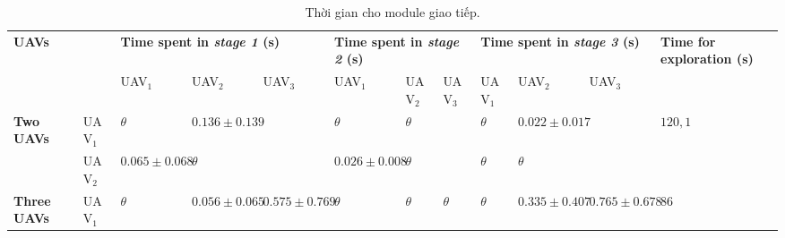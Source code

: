 \documentclass[11pt,openany]{book}
\begin{document}
\begin{table}[H]
    \centering
    \small
    \caption{Thời gian cho module giao tiếp.}
    \label{tab:4.4}
    \begin{tabular}{|p{0.8cm}|p{0.7cm}|p{0.7cm}|p{0.7cm}|p{0.7cm}|p{0.7cm}|p{0.7cm}|p{0.7cm}|p{0.7cm}|p{0.7cm}|p{0.7cm}|p{1cm}|}\hline
        \multicolumn{2}{|l|}{\multirow{2}{1cm}{\textbf{UAVs}}} & \multicolumn{3}{|p{2.1cm}|}{\textbf{Time spent in \textit{stage 1} (s)}} & \multicolumn{3}{|p{2.1cm}|}{\textbf{Time spent in \textit{stage 2} (s)}} & \multicolumn{3}{|p{2.1cm}|}{\textbf{Time spent in \textit{stage 3} (s)}} & \textbf{Time for exploration (s)}                                                                                                                      \\\cline{3-11}
        \multicolumn{2}{|l|}{}                                 & UAV$_1$                                                                  & UAV$_2$                                                                  & UAV$_3$                                                                  & UAV$_1$                           & UAV$_2$           & UAV$_3$  & UAV$_1$  & UAV$_2$  & UAV$_3$           &                                           \\\hline
        \multirow{2}{0.8cm}{\textbf{Two UAVs}}                 & UAV$_1$                                                                  & $\theta$                                                                 & $0.136\pm 0.139$                                                         &                                   & $\theta$          & $\theta$ &          & $\theta$ & $0.022 \pm 0.017$ &                   & $120,1$               \\\cline{2-11}
                                                               & UAV$_2$                                                                  & $0.065 \pm 0.068$                                                        & $\theta$                                                                 &                                   & $0.026 \pm 0.008$ & $\theta$ &          & $\theta$ & $\theta$          &                   &                       \\\hline
        \multirow{3}{0.8cm}{\textbf{Three UAVs}}               & UAV$_1$                                                                  & $\theta$                                                                 & $0.056 \pm 0.065$                                                        & $0.575 \pm 0.769$                 & $\theta$          & $\theta$ & $\theta$ & $\theta$ & $0.335 \pm 0.407$ & $0.765 \pm 0.678$ & \multirow{3}{1cm}{86} \\\cline{2-11}

\end{tabular}
\end{table}
\end{document}
